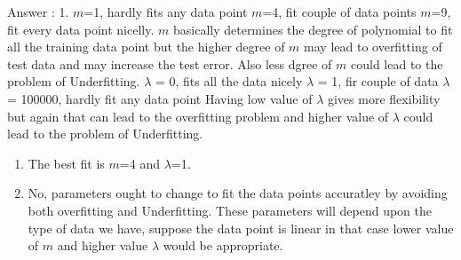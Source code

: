 \documentclass[11pt]{article}
\begin{document}
    Answer : 1. \(m\)=1, hardly fits any data point \(m\)=4, fit couple of
data points \(m\)=9, fit every data point nicelly. \(m\) basically
determines the degree of polynomial to fit all the training data point
but the higher degree of \(m\) may lead to overfitting of test data and
may increase the test error. Also less dgree of \(m\) could lead to the
problem of Underfitting. \(\lambda\) = 0, fits all the data nicely
\(\lambda\) = 1, fir couple of data \(\lambda\) = 100000, hardly fit any
data point Having low value of \(\lambda\) gives more flexibility but
again that can lead to the overfitting problem and higher value of
\(\lambda\) could lead to the problem of Underfitting.

\begin{enumerate}
\def\labelenumi{\arabic{enumi}.}
\setcounter{enumi}{1}
\item
  The best fit is \(m\)=4 and \(\lambda\)=1.
\item
  No, parameters ought to change to fit the data points accuratley by
  avoiding both overfitting and Underfitting. These parameters will
  depend upon the type of data we have, suppose the data point is linear
  in that case lower value of \(m\) and higher value \(\lambda\) would
  be appropriate.
\end{enumerate}


    
    
    
    
\end{document}
